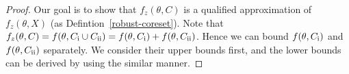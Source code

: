 \documentclass{article}
\newcommand{\Rnum}[1]{\uppercase\expandafter{\romannumeral #1} }
\newtheorem{lemma}{Lemma}
\begin{document}
\begin{proof}
%
 




Our goal is to show that $ f_{z}(\theta,C)$ is a qualified approximation of $ f_{z}(\theta,X)$ (as Defintion~\ref{robust-coreset}).  
Note that $ f_{z}(\theta,C)=f(\theta,C_\mathrm{\Rnum{1}}\cup C_\mathrm{\Rnum{2}})=f(\theta,C_\mathrm{\Rnum{1}})+f(\theta,C_\mathrm{\Rnum{2}}) $. Hence we can bound $ f(\theta,C_\mathrm{\Rnum{1}}) $ and $ f(\theta,C_\mathrm{\Rnum{2}}) $ separately. We consider their upper bounds first, and the lower bounds can be derived by using the similar manner. 



\end{proof}
\end{document}
